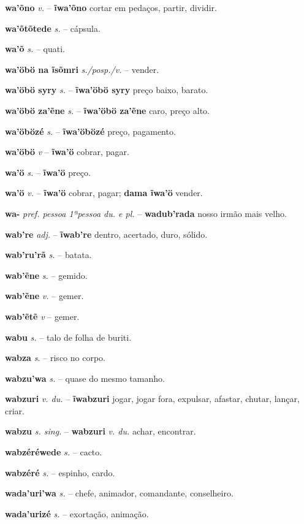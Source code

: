 \textbf{wa'õno} \textit{v.} -- \textbf{ĩwa'õno} cortar em pedaços, partir, dividir.

\textbf{wa'õtõtede} \textit{s.} -- cápsula.

\textbf{wa'õ} \textit{s.} -- quati.

\textbf{wa'öbö na ĩsõmri} \textit{s./posp./v.} -- vender.

\textbf{wa'öbö syry} \textit{s.} -- \textbf{ĩwa'öbö syry} preço baixo, barato.

\textbf{wa'öbö za'ẽne} \textit{s.} -- \textbf{ĩwa'öbö za'ẽne} caro, preço alto.

\textbf{wa'öbözé} \textit{s.} -- \textbf{ĩwa'öbözé} preço, pagamento.

\textbf{wa'öbö} \textit{v} -- \textbf{ĩwa'ö} cobrar, pagar.

\textbf{wa'ö} \textit{s.} -- \textbf{ĩwa'ö} preço.

\textbf{wa'ö} \textit{v.} -- \textbf{ĩwa'ö} cobrar, pagar; \textbf{dama ĩwa'ö} vender.

\textbf{wa-} \textit{pref. pessoa 1ªpessoa du. e pl.} -- \textbf{wadub'rada} nosso irmão mais velho.

\textbf{wab're} \textit{adj.} -- \textbf{ĩwab're} dentro, acertado, duro, sólido.

\textbf{wab'ru'rã} \textit{s.} -- batata.

\textbf{wab'ẽne} \textit{s.} -- gemido.

\textbf{wab'ẽne} \textit{v.} -- gemer.

\textbf{wab'ẽtẽ} \textit{v} -- gemer.

\textbf{wabu} \textit{s.} -- talo de folha de buriti.

\textbf{wabza} \textit{s.} -- risco no corpo.

\textbf{wabzu'wa} \textit{s.} -- quase do mesmo tamanho.

\textbf{wabzuri} \textit{v. du.} -- \textbf{ĩwabzuri} jogar, jogar fora, expulsar, afastar, chutar, lançar, criar.

\textbf{wabzu} \textit{s. sing.} -- \textbf{wabzuri} \textit{v. du.} achar, encontrar.

\textbf{wabzéréwede} \textit{s.} -- cacto.

\textbf{wabzéré} \textit{s.} -- espinho, cardo.

\textbf{wada'uri'wa} \textit{s.} -- chefe, animador, comandante, conselheiro.

\textbf{wada'urizé} \textit{s.} -- exortação, animação.

